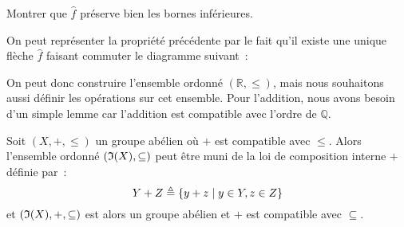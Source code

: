 \begin{exercise}
  Montrer que $\hat f$ préserve bien les bornes inférieures.
\end{exercise}

\begin{remark}
  On peut représenter la propriété précédente par le fait qu'il existe une
  unique flèche $\hat f$ faisant commuter le diagramme suivant~:
  \begin{center}
  \end{center}
\end{remark}

On peut donc construire l'ensemble ordonné $(\mathbb R,\leq)$, mais nous
souhaitons aussi définir les opérations sur cet ensemble. Pour l'addition, nous
avons besoin d'un simple lemme car l'addition est compatible avec l'ordre de
$\mathbb Q$.

\begin{lemma}\label{lem.R.compat}
  Soit $(X,+,\leq)$ un groupe abélien où $+$ est compatible avec
  $\leq$. Alors l'ensemble ordonné $(\mathfrak{I}(X),\subseteq)$ peut être muni de
  la loi de composition interne $+$ définie par~:
  \[Y + Z \triangleq \{y + z \mid y \in Y, z \in Z\}\]
  et $(\mathfrak{I}(X),+,\subseteq)$ est alors un groupe abélien et $+$ est compatible
  avec $\subseteq$.
\end{lemma}

